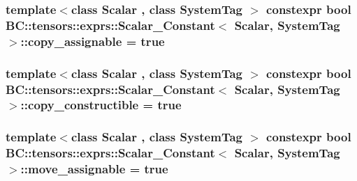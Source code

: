 \subsubsection[{\texorpdfstring{copy\+\_\+assignable}{copy_assignable}}]{\setlength{\rightskip}{0pt plus 5cm}template$<$class Scalar , class System\+Tag $>$ constexpr bool {\bf B\+C\+::tensors\+::exprs\+::\+Scalar\+\_\+\+Constant}$<$ {\bf Scalar}, System\+Tag $>$\+::copy\+\_\+assignable = true\hspace{0.3cm}{\ttfamily [static]}}\hypertarget{structBC_1_1tensors_1_1exprs_1_1Scalar__Constant_a22d3dec437bd51ac3d90098b1f514453}{}\label{structBC_1_1tensors_1_1exprs_1_1Scalar__Constant_a22d3dec437bd51ac3d90098b1f514453}
\subsubsection[{\texorpdfstring{copy\+\_\+constructible}{copy_constructible}}]{\setlength{\rightskip}{0pt plus 5cm}template$<$class Scalar , class System\+Tag $>$ constexpr bool {\bf B\+C\+::tensors\+::exprs\+::\+Scalar\+\_\+\+Constant}$<$ {\bf Scalar}, System\+Tag $>$\+::copy\+\_\+constructible = true\hspace{0.3cm}{\ttfamily [static]}}\hypertarget{structBC_1_1tensors_1_1exprs_1_1Scalar__Constant_aff8b41ea968094d908b4ef13e3f5784f}{}\label{structBC_1_1tensors_1_1exprs_1_1Scalar__Constant_aff8b41ea968094d908b4ef13e3f5784f}
\subsubsection[{\texorpdfstring{move\+\_\+assignable}{move_assignable}}]{\setlength{\rightskip}{0pt plus 5cm}template$<$class Scalar , class System\+Tag $>$ constexpr bool {\bf B\+C\+::tensors\+::exprs\+::\+Scalar\+\_\+\+Constant}$<$ {\bf Scalar}, System\+Tag $>$\+::move\+\_\+assignable = true\hspace{0.3cm}{\ttfamily [static]}}\hypertarget{structBC_1_1tensors_1_1exprs_1_1Scalar__Constant_a1079c90778cb91cb909f41244c6e82d7}{}\label{structBC_1_1tensors_1_1exprs_1_1Scalar__Constant_a1079c90778cb91cb909f41244c6e82d7}
